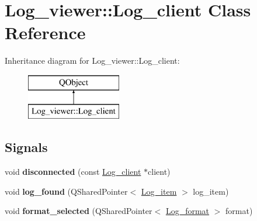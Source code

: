 \hypertarget{class_log__viewer_1_1_log__client}{\section{Log\-\_\-viewer\-:\-:Log\-\_\-client Class Reference}
\label{class_log__viewer_1_1_log__client}
}
Inheritance diagram for Log\-\_\-viewer\-:\-:Log\-\_\-client\-:\begin{figure}[H]
\begin{center}
\leavevmode
\includegraphics[height=2.000000cm]{class_log__viewer_1_1_log__client}
\end{center}
\end{figure}
\subsection*{Signals}
\begin{DoxyCompactItemize}
\item 
\hypertarget{class_log__viewer_1_1_log__client_aa33a44112924a8e930efd38a8e179bee}{void {\bfseries disconnected} (const \hyperlink{class_log__viewer_1_1_log__client}{Log\-\_\-client} $\ast$client)}\label{class_log__viewer_1_1_log__client_aa33a44112924a8e930efd38a8e179bee}

\item 
\hypertarget{class_log__viewer_1_1_log__client_a3888e37d99d0867e052e0bf199f2ad31}{void {\bfseries log\-\_\-found} (Q\-Shared\-Pointer$<$ \hyperlink{class_log__viewer_1_1_log__item}{Log\-\_\-item} $>$ log\-\_\-item)}\label{class_log__viewer_1_1_log__client_a3888e37d99d0867e052e0bf199f2ad31}

\item 
\hypertarget{class_log__viewer_1_1_log__client_af9e847fe495aaedca2dd12c9b6dc140e}{void {\bfseries format\-\_\-selected} (Q\-Shared\-Pointer$<$ \hyperlink{class_log__viewer_1_1_log__format}{Log\-\_\-format} $>$ format)}\label{class_log__viewer_1_1_log__client_af9e847fe495aaedca2dd12c9b6dc140e}

\end{DoxyCompactItemize}
